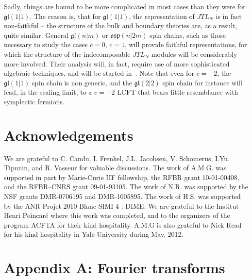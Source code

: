 \documentclass[11pt]{article}
\renewcommand{\theequation}{\thesection.\arabic{equation}}
\newcommand{\JTL}[1]{JTL_{#1}}
\newcommand{\gl}{\mathfrak{gl}}
\theoremstyle{definition}
\begin{document}
Sadly, things are bound to be more complicated in most cases than they were for $\gl(1|1)$. The reason is, that for $\gl(1|1)$, the representation of
$\JTL{N}$ is in fact non-faithful -- the
structure of the bulk and boundary theories are, as a result, quite
similar. General $\gl(n|m)$ or $\mathfrak{osp}(n|2m)$  spin chains, such as those necessary to study the cases $c=0$, $c=1$, will provide faithful representations, for which the
structure of the indecomposable $\JTL{N}$ modules will be considerably more involved. Their analysis will, in fact, require use of more sophisticated algebraic techniques, and will be started in~\cite{GRS4}. Note that even for $c=-2$, the $\gl(1|1)$ spin chain is non generic, and the  $\gl(2|2)$ spin chain for instance will lead, in the scaling limit, to a $c=-2$ LCFT that bears little resemblance with symplectic fermions.



\section*{Acknowledgements} We are grateful to C. Candu, I. Frenkel,
J.L. Jacobsen, V. Schomerus, I.Yu. Tipunin, and R. Vasseur for valuable
discussions. The work of A.M.G. was supported in part by Marie-Curie IIF fellowship, the
RFBR grant 10-01-00408, and the RFBR--CNRS grant
09-01-93105. The work of N.R. was supported by the NSF grants DMR-0706195 and DMR-1005895.  The work of H.S. was supported by the ANR Projet 2010
Blanc SIMI 4 : DIME.  We are grateful to the  Institut Henri Poincar\'e where this work was completed, and to the organizers of the program ACFTA for their kind hospitality. A.M.G is also grateful to Nick Read for his
kind hospitality in Yale University during May, 2012.

\section*{Appendix A: Fourier transforms}\label{sec:fourier}
\renewcommand\thesection{A}
\renewcommand{\theequation}{A\arabic{equation}}
\setcounter{equation}{0}
\end{document}
